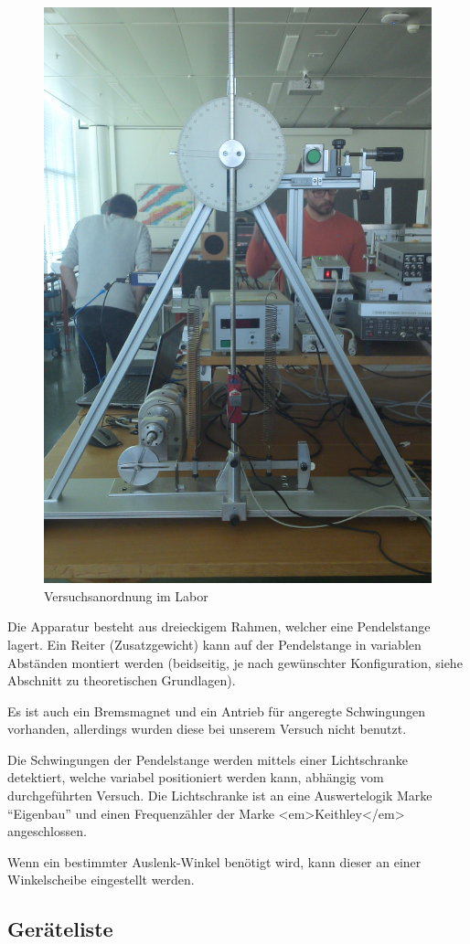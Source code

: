 \begin{figure}[h!]
    \centering
    \includegraphics[width=.6\textwidth]{images/versuchsanordnung.jpg}
    \caption{%
        Versuchsanordnung im Labor
    }
    \label{fig:versuchsapparaturFoto}
\end{figure}

Die  Apparatur  besteht  aus  dreieckigem Rahmen,  welcher  eine  Pendelstange
lagert. Ein  Reiter (Zusatzgewicht)  kann  auf der  Pendelstange in  variablen
Abst\"anden montiert werden (beidseitig,  je nach gew\"unschter Konfiguration,
siehe Abschnitt zu theoretischen Grundlagen).

Es  ist auch  ein Bremsmagnet  und  ein Antrieb  f\"ur angeregte  Schwingungen
vorhanden, allerdings wurden diese bei unserem Versuch nicht benutzt.

Die  Schwingungen   der  Pendelstange   werden  mittels   einer  Lichtschranke
detektiert,  welche   variabel  positioniert   werden  kann,   abh\"angig  vom
durchgef\"uhrten   Versuch. Die  Lichtschranke   ist  an   eine  Auswertelogik
Marke  ``Eigenbau''  und  einen Frequenz\"ahler  der  Marke  <em>Keithley</em>
angeschlossen.

Wenn  ein bestimmter  Auslenk-Winkel  ben\"otigt wird,  kann  dieser an  einer
Winkelscheibe eingestellt werden.

\subsection{Ger\"ateliste}
\label{subsec:deviceList}

